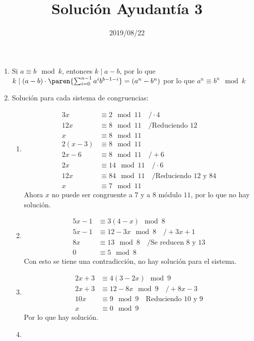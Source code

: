 \documentclass{ayudantia}
\title{Solución Ayudantía 3}
\date{2019/08/22}
\begin{document}
\maketitle
\begin{enumerate}
    \item Si \(a\equiv b\mod k\), entonces \(k\mid a-b\), por lo que \(k\mid (a-b)\cdot\paren{\sum_{i=0}^{n-1}a^ib^{b-1-i}}=(a^n-b^n)\) por lo que \(a^n\equiv b^n\mod k\)
    \item Solución para cada sistema de congruencias:
    \begin{enumerate}
        \item \begin{align*}
            3x&\equiv 2\mod 11 \quad/\cdot 4\\
            12x&\equiv 8\mod 11 \quad/\text{Reduciendo \(12\)}\\
            x&\equiv 8\mod 11\\
            2(x-3)&\equiv 8\mod 11\\
            2x-6&\equiv 8\mod 11 \quad/+6\\
            2x&\equiv 14\mod 11 \quad/\cdot6\\
            12x&\equiv 84\mod 11 \quad/\text{Reduciendo \(12\) y \(84\)}\\
            x&\equiv 7\mod 11
        \end{align*}
        Ahora \(x\) no puede ser congruente a \(7\) y a \(8\) módulo \(11\), por lo que no hay solución.
        \item \begin{align*}
            5x-1&\equiv 3(4-x)\mod 8\\
            5x-1&\equiv 12-3x\mod 8\quad/+3x+1\\
            8x&\equiv 13\mod 8\quad/\text{Se reducen \(8\) y \(13\)}\\
            0&\equiv 5\mod 8
        \end{align*}
        Con esto se tiene una contradicción, no hay solución para el sistema.
        \item \begin{align*}
            2x+3&\equiv 4(3-2x)\mod 9\\
            2x+3&\equiv 12-8x\mod 9\quad/+8x-3\\
            10x&\equiv 9\mod 9\quad\text{Reduciendo \(10\) y \(9\)}\\
            x&\equiv 0\mod 9
        \end{align*}
        Por lo que hay solución.
        \item \begin{align*}

\end{align*}
\end{enumerate}
\end{enumerate}
\end{document}
